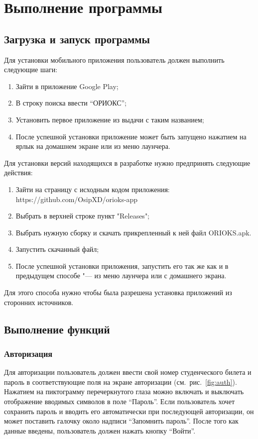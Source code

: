 \chapter{Выполнение программы}
\label{ch:execution}

\section{Загрузка и запуск программы}
\label{sec:running}
Для установки мобильного приложения пользователь должен выполнить следующие шаги:
\begin{enumerate}
  \item Зайти в приложение Google Play;
  \item В строку поиска ввести ``ОРИОКС'';
  \item Установить первое приложение из выдачи с таким названием;
  \item После успешной установки приложение может быть запущено нажатием на ярлык на домашнем экране или из меню лаунчера.
\end{enumerate}

Для установки версий находящихся в разработке нужно предпринять следующие действия:
\begin{enumerate}
  \item Зайти на страницу с исходным кодом приложения: https://github.com/OsipXD/orioks-app
  \item Выбрать в верхней строке пункт "Releases";
  \item Выбрать нужную сборку и скачать прикрепленный к ней файл ORIOKS.apk.
  \item Запустить скачанный файл;
  \item После успешной установки приложения, запустить его так же как и в предыдущем способе "--- из меню лаунчера или с домашнего экрана.
\end{enumerate}
Для этого способа нужно чтобы была разрешена установка приложений из сторонних источников.

\section{Выполнение функций}
\label{sec:execFunctions}

\subsection*{Авторизация}
Для авторизации пользователь должен ввести свой номер студенческого билета и пароль в соответствующие поля на экране авторизации (см.~рис.~\ref{fig:auth}).
Нажатием на пиктограмму перечеркнутого глаза можно включать и выключать отображение вводимых символов в поле ``Пароль''.
Если пользователь хочет сохранить пароль и вводить его автоматически при последующей авторизации, он может поставить галочку около надписи ``Запомнить пароль''.
После того как данные введены, пользователь должен нажать кнопку ``Войти''.

